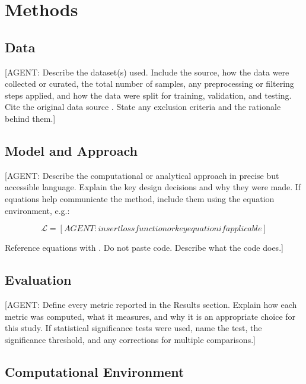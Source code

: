 \documentclass[9pt,a4paper,twocolumn,twoside]{rho-class/rho}
\begin{document}
\section{Methods}

    \subsection{Data}

        [AGENT: Describe the dataset(s) used. Include the
        source, how the data were collected or curated,
        the total number of samples, any preprocessing or
        filtering steps applied, and how the data were
        split for training, validation, and testing.
        Cite the original data source \cite{example_dataset}.
        State any exclusion criteria and the rationale
        behind them.]

    \subsection{Model and Approach}

        [AGENT: Describe the computational or analytical
        approach in precise but accessible language.
        Explain the key design decisions and why they were
        made. If equations help communicate the method,
        include them using the equation environment, e.g.:

        \begin{equation}\label{eq:loss}
            \mathcal{L} = [AGENT: insert loss function or
            key equation if applicable]
        \end{equation}

        Reference equations with . Do not
        paste code. Describe what the code does.]

    \subsection{Evaluation}

        [AGENT: Define every metric reported in the Results
        section. Explain how each metric was computed, what
        it measures, and why it is an appropriate choice
        for this study. If statistical significance tests
        were used, name the test, the significance
        threshold, and any corrections for multiple
        comparisons.]

    \subsection{Computational Environment}
\end{document}
